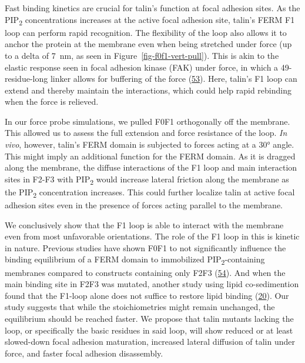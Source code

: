 \documentclass[
  twocolumn]{biophys-new-mod}
\begin{document}
Fast binding kinetics are crucial for talin's function at focal adhesion
sites. As the PIP\textsubscript{2} concentrations increases at the
active focal adhesion site, talin's FERM F1 loop can perform rapid
recognition. The flexibility of the loop also allows it to anchor the
protein at the membrane even when being stretched under force (up to a
delta of 7~nm, as seen in Figure~\ref{fig-f0f1-vert-pull}). This is akin
to the elastic response seen in focal adhesion kinase (FAK) under force,
in which a 49-residue-long linker allows for buffering of the force
(\protect\hyperlink{ref-bauerStructuralMechanisticInsights2019}{53}).
Here, talin's F1 loop can extend and thereby maintain the interactions,
which could help rapid rebinding when the force is relieved.

In our force probe simulations, we pulled F0F1 orthogonally off the
membrane. This allowed us to assess the full extension and force
resistance of the loop. \emph{In vivo}, however, talin's FERM domain is
subjected to forces acting at a 30° angle. This might imply an
additional function for the FERM domain. As it is dragged along the
membrane, the diffuse interactions of the F1 loop and main interaction
sites in F2-F3 with PIP\textsubscript{2} would increase lateral friction
along the membrane as the PIP\textsubscript{2} concentration increases.
This could further localize talin at active focal adhesion sites even in
the presence of forces acting parallel to the membrane.

We conclusively show that the F1 loop is able to interact with the
membrane even from most unfavorable orientations. The role of the F1
loop in this is kinetic in nature. Previous studies have shown F0F1 to
not significantly influence the binding equilibrium of a FERM domain to
immobilized PIP\textsubscript{2}-containing membranes compared to
constructs containing only F2F3
(\protect\hyperlink{ref-mooreAffinityTalin1V3integrin2012a}{54}). And
when the main binding site in F2F3 was mutated, another study using
lipid co-sedimention found that the F1-loop alone does not suffice to
restore lipid binding
(\protect\hyperlink{ref-chinthalapudiInteractionTalinCell2018a}{20}).
Our study suggests that while the stoichiometries might remain
unchanged, the equilibrium should be reached faster. We propose that
talin mutants lacking the loop, or specifically the basic residues in
said loop, will show reduced or at least slowed-down focal adhesion
maturation, increased lateral diffusion of talin under force, and faster
focal adhesion disassembly.
\end{document}
